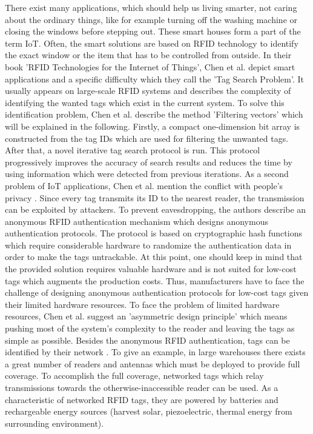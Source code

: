 There exist many applications, which should help us living smarter, not caring about the ordinary things, like for example turning off the washing machine or closing the windows before stepping out. These smart houses form a part of the term \ac{IoT}. Often, the smart solutions are based on RFID technology to identify the exact window or the item that has to be controlled from outside. 
In their book 'RFID Technologies for the Internet of Things', Chen et al. \cite[p.2 f.]{chen} depict smart applications and a specific difficulty which they call the 'Tag Search Problem'. It usually appears on large-scale RFID systems and describes the complexity of identifying the wanted tags which exist in the current system. To solve this identification problem, Chen et al. describe the method 'Filtering vectors' which will be explained in the following. 
Firstly, a compact one-dimension bit array is constructed from the tag IDs which are used for filtering the unwanted tags. After that, a novel iterative tag search protocol is run. This protocol progressively improves the accuracy of search results and reduces the time by using information which were detected from previous iterations.
As a second problem of IoT applications, Chen et al. mention the conflict with people's privacy \cite[p.3 f.]{chen}. Since every tag transmits its ID to the nearest reader, the transmission can be exploited by attackers. To prevent eavesdropping, the authors describe an anonymous RFID authentication mechanism which designs anonymous authentication protocols. The protocol is based on cryptographic hash functions which require considerable hardware to randomize the authentication data in order to make the tags untrackable. At this point, one should keep in mind that the provided solution requires valuable hardware and is not suited for low-cost tags which augments the production costs. Thus, manufacturers have to face the challenge of designing anonymous authentication protocols for low-cost tags given their limited hardware resources. 
To face the problem of limited hardware resources, Chen et al. suggest an 'asymmetric design principle' \cite[p.4]{chen} which means pushing most of the system's complexity to the reader and leaving the tags as simple as possible. 
Besides the anonymous RFID authentication, tags can be identified by their network \cite[p.4 f.]{chen}. To give an example, in large warehouses there exists a great number of readers and antennas which must be deployed to provide full coverage. To accomplish the full coverage, networked  tags which relay transmissions towards the otherwise-inaccessible reader can be used. As a characteristic of networked RFID tags, they are powered by batteries and rechargeable energy sources (harvest solar, piezoelectric, thermal energy from surrounding environment).
